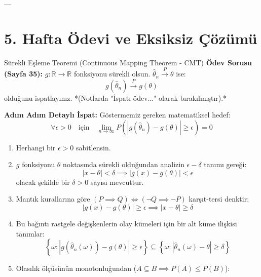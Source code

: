 \documentclass[12pt,a4paper]{article}
\begin{document}
---

\section{5. Hafta Ödevi ve Eksiksiz Çözümü}

\begin{odev}{Sürekli Eşleme Teoremi (Continuous Mapping Theorem - CMT)}
\textbf{Ödev Sorusu (Sayfa 35):} $g: \mathbb{R} \to \mathbb{R}$ fonksiyonu sürekli olsun. $\hat{\theta}_n \xrightarrow{P} \theta$ ise:
\begin{equation}
    g(\hat{\theta}_n) \xrightarrow{P} g(\theta)
\end{equation}
olduğunu ispatlayınız. *(Notlarda "İspatı ödev..." olarak bırakılmıştır).*

\bigskip
\textbf{Adım Adım Detaylı İspat:}
Göstermemiz gereken matematiksel hedef:
\begin{equation}
    \forall \epsilon > 0 \quad \text{için} \quad \lim_{n \to \infty} P\left( |g(\hat{\theta}_n) - g(\theta)| \ge \epsilon \right) = 0
\end{equation}
\begin{enumerate}
    \item Herhangi bir $\epsilon > 0$ sabitlensin.
    \item $g$ fonksiyonu $\theta$ noktasında sürekli olduğundan analizin $\epsilon-\delta$ tanımı gereği:
    \begin{equation}
        |x - \theta| < \delta \implies |g(x) - g(\theta)| < \epsilon
    \end{equation}
    olacak şekilde bir $\delta > 0$ sayısı mevcuttur.
    \item Mantık kurallarına göre $(P \implies Q) \iff (\neg Q \implies \neg P)$ karşıt-tersi denktir:
    \begin{equation}
        |g(x) - g(\theta)| \ge \epsilon \implies |x - \theta| \ge \delta
    \end{equation}
    \item Bu bağıntı rastgele değişkenlerin olay kümeleri için bir alt küme ilişkisi tanımlar:
    \begin{equation}
        \left\{ \omega : |g(\hat{\theta}_n(\omega)) - g(\theta)| \ge \epsilon \right\} \subseteq \left\{ \omega : |\hat{\theta}_n(\omega) - \theta| \ge \delta \right\}
    \end{equation}
    \item Olasılık ölçüsünün monotonluğundan ($A \subseteq B \implies P(A) \le P(B)$):
    \begin{equation}

\end{equation}
\end{enumerate}
\end{odev}
\end{document}
